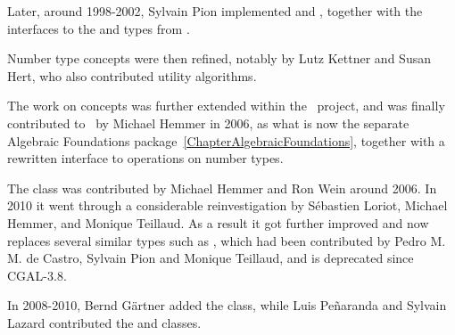 Later, around 1998-2002, Sylvain Pion implemented 
 and , together with the interfaces to
the  and  types from \gmp.

Number type concepts were then refined, notably by Lutz Kettner and
Susan Hert, who also contributed utility algorithms.

The work on concepts was further extended within the \exacus\ project, and was finally
contributed to \cgal\ by Michael Hemmer in 2006, as what is now the separate
Algebraic Foundations package~\ref{ChapterAlgebraicFoundations}, together with
a rewritten interface to operations on number types.

The class  was contributed by Michael Hemmer and Ron Wein around 2006. In 2010 it went through a considerable reinvestigation by S\'ebastien Loriot, Michael Hemmer, and Monique Teillaud. As a result it got further improved and now replaces several similar types such as , which had been contributed by Pedro M. M. de Castro, Sylvain Pion and Monique Teillaud, and is deprecated since CGAL-3.8. 


In 2008-2010, Bernd G\"artner added the  class, while
Luis Pe\~naranda and Sylvain Lazard contributed the  and
 classes.



%
%


% 
